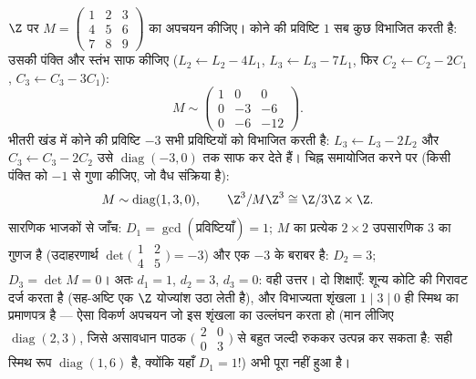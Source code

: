 \begin{example}[एक पूर्ण स्मिथ अपचयन]
\label{ex:b3:modules:smithworked}
$\Z$ पर $M = \begin{pmatrix} 1 & 2 & 3\\ 4 & 5 & 6\\ 7 & 8 & 9
\end{pmatrix}$ का अपचयन कीजिए। कोने की प्रविष्टि $1$ सब कुछ
विभाजित करती है: उसकी पंक्ति और स्तंभ साफ कीजिए ($L_2 \leftarrow L_2 - 4L_1$, $L_3
\leftarrow L_3 - 7L_1$,
फिर $C_2 \leftarrow C_2 - 2C_1$, $C_3
\leftarrow C_3 - 3C_1$):
\[
M \sim \begin{pmatrix} 1 & 0 & 0\\ 0 & -3 & -6\\ 0 & -6 & -12
\end{pmatrix} .
\]
भीतरी खंड में कोने की प्रविष्टि $-3$ सभी प्रविष्टियों को
विभाजित करती है: $L_3
\leftarrow L_3 - 2L_2$ और $C_3 \leftarrow C_3 - 2C_2$ उसे $\operatorname{diag}(-3, 0)$ तक साफ कर देते हैं।
चिह्न समायोजित करने पर (किसी पंक्ति को $-1$ से गुणा कीजिए, जो
वैध संक्रिया है):
\[
M \sim \operatorname{diag}(1, 3, 0),
\qquad
\Z^3/M\Z^3 \cong \Z/3\Z \times \Z .
\]
सारणिक भाजकों से जाँच: $D_1 =
\gcd(\text{प्रविष्टियाँ}) = 1$; $M$ का प्रत्येक $2\times2$ उपसारणिक
$3$ का गुणज है (उदाहरणार्थ $\det\bigl(\begin{smallmatrix}1 & 2\\ 4
& 5\end{smallmatrix}\bigr) = -3$) और एक $-3$ के बराबर है:
$D_2 =
3$; $D_3 = \det M = 0$। अतः $d_1 = 1$, $d_2 = 3$, $d_3 = 0$: वही उत्तर। दो शिक्षाएँ:
शून्य  कोटि की गिरावट दर्ज करता है (सह-अष्टि एक
 $\Z$ योज्यांश उठा लेती है), और विभाज्यता शृंखला $1 \mid 3 \mid 0$ ही
स्मिथ का प्रमाणपत्र है --- ऐसा विकर्ण अपचयन जो इस शृंखला का
उल्लंघन करता हो (मान लीजिए $\operatorname{diag}(2, 3)$, जिसे असावधान पाठक $\bigl(\begin{smallmatrix}2 & 0\\ 0 &
3\end{smallmatrix}\bigr)$ से
बहुत जल्दी रुककर उत्पन्न कर सकता है: सही स्मिथ रूप $\operatorname{diag}(1, 6)$ है,
क्योंकि यहाँ $D_1 = 1$!) अभी पूरा नहीं हुआ है।
\end{example}

